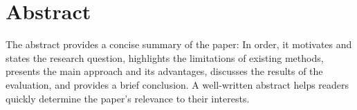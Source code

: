 
\chapter{Abstract}
\label{ch:abstract}

The abstract provides a concise summary of the paper:
In order, it motivates and states the research question, highlights the limitations of existing methods, presents the main approach and its advantages, discusses the results of the evaluation, and provides a brief conclusion.
A well-written abstract helps readers quickly determine the paper's relevance to their interests.








